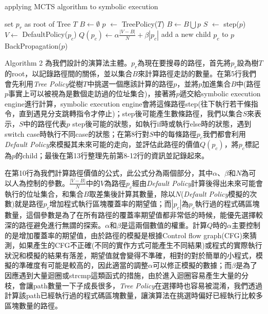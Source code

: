 \documentclass[12pt,a4paper,oneside]{book}
\begin{document}
\begin{algorithm}[htbp]
  \caption{applying MCTS algorithm to symbolic execution}
  \begin{algorithmic}[1]
    \State set $p_r$ as root of Tree $T$
    \State $B \leftarrow \emptyset$
      \State $p$ $\leftarrow$ TreePolicy($T$)
      \State $B \leftarrow B \bigcup p$
      \State $S$ $\leftarrow$ step($p$)
      	\State $V \leftarrow$ DefaultPolicy($p_c$)
        \State $Q(p_c) \leftarrow \alpha \frac{|V-B|}{N} + \beta|p_c|$
        \State add a new child $p_c$ to $p$
      \EndFor
      \State BackPropagation($p$)
    \EndWhile
    \EndFunction
  \end{algorithmic}
\end{algorithm}

Algorithm 2 為我們設計的演算法主體。$p_r$為現在要搜尋的路徑，首先將$p_r$設為樹$T$的root，以記錄路徑間的關係，並以集合$B$來計算路徑走訪的數量。在第5行我們會先利用\textit{Tree Policy}從樹$T$中挑選一個應該計算的路徑$p$，並將$p$加進集合$B$中(路徑$p$事實上可以被視為是數個走訪過的位址集合)，接著將$p$遞交給symbolic execution engine進行計算，symbolic execution engine會將這條路徑step(往下執行若干條指令，直到遇見分支跳轉指令才停止)；step後可能產生數條路徑，我們以集合$S$來表示，$S$中的路徑代表$p$ step後可能的狀態，如執行if時或執行else時的狀態，遇到switch case時執行不同case的狀態；在第8行對$S$中的每條路徑$p_c$我們都會利用\textit{Default Policy}來模擬其未來可能的走向，並評估此路徑的價值$Q(p_c)$，將$p_c$標記為$p$的child；最後在第13行整理先前第8-12行的資訊並記錄起來。

在第10行為我們計算路徑價值的公式，此公式分為兩個部分，其中$\alpha$、$\beta$和$N$為可以人為控制的參數。$\frac{|V-B|}{N}$中的$V$為路徑$p_c$經由\textit{Default Policy}計算後得出未來可能會執行的位址集合，和集合$B$取差集後計算其數量，除以$N$(\textit{Default Policy}模擬的次數)就是路徑$p_c$增加程式執行區塊覆蓋率的期望值；而$|p_c|$為$p_c$執行過的程式碼區塊數量，這個參數是為了在所有路徑的覆蓋率期望值都非常低的時候，能優先選擇較深的路徑避免進行無謂的探索。$\alpha$和$\beta$是這兩個數值的權重。計算$Q$時的$\alpha$主要控制的是增加覆蓋率的期望值，由於路徑的模擬是根據Control flow graph(CFG)來猜測，如果產生的CFG不正確(不同的實作方式可能產生不同結果)或程式的實際執行狀況和模擬的結果有落差，期望值就會變得不準確，相對的對於簡單的小程式，模擬的準確度有可能是較高的，因此適當的調整$\alpha$可以修正模擬的數據；而$\beta$是為了因應遇到大量迴圈或strcmp這類函式的措施，由於進入迴圈容易產生大量的分枝，會讓path數量一下子成長很多，\textit{Tree Policy}在選擇時也容易被混淆，我們透過計算該path已經執行過的程式碼區塊數量，讓演算法在挑選時偏好已經執行比較多區塊數量的路徑。
\end{document}
